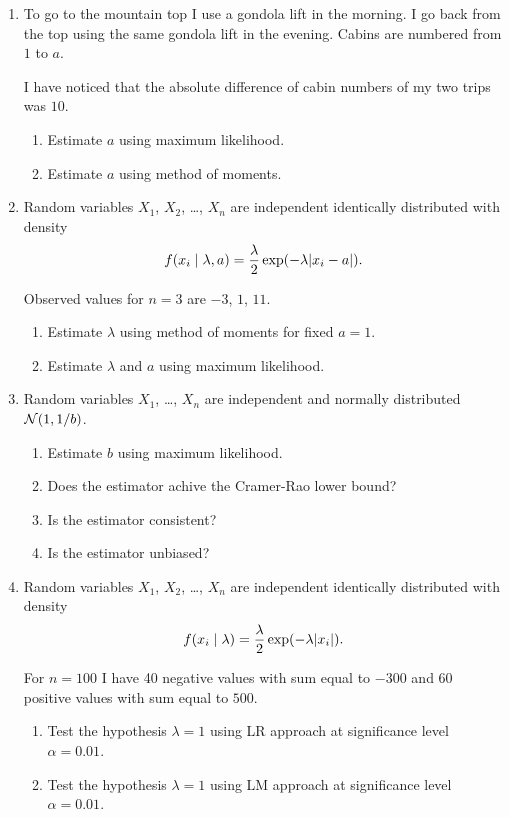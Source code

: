 \begin{enumerate}


    \item To go to the mountain top I use a gondola lift in the morning. 
    I go back from the top using the same gondola lift in the evening. 
    Cabins are numbered from $1$ to $a$. 

    I have noticed that the absolute difference of cabin numbers of my two trips was $10$. 

    \begin{enumerate}
        \item Estimate $a$ using maximum likelihood. 
        \item Estimate $a$ using method of moments. 
    \end{enumerate}

    \item Random variables $X_1$, $X_2$, \ldots,  $X_n$ are independent identically distributed with density 
    \[
    f(x_i \mid \lambda, a) = \frac{\lambda}{2} \exp(-\lambda \lvert x_i - a\rvert).    
    \]

    Observed values for $n=3$ are $-3$, $1$, $11$.

    \begin{enumerate}
        \item Estimate $\lambda$ using method of moments for fixed $a = 1$. 
        \item Estimate $\lambda$ and $a$ using maximum likelihood.
    \end{enumerate}

    \item Random variables $X_1$, \ldots, $X_n$ are independent and normally distributed $\mathcal{N}(1, 1/b)$. 
    
    \begin{enumerate}
        \item Estimate $b$ using maximum likelihood.
        \item Does the estimator achive the Cramer-Rao lower bound?
        \item Is the estimator consistent?
        \item Is the estimator unbiased?
    \end{enumerate}

    \item Random variables $X_1$, $X_2$, \ldots,  $X_n$ are independent identically distributed with density 
    \[
    f(x_i \mid \lambda) = \frac{\lambda}{2} \exp(-\lambda \lvert x_i\rvert).    
    \]

    For $n=100$ I have 40 negative values with sum equal to $-300$ and 60 positive values with sum equal to $500$. 

    \begin{enumerate}
        \item Test the hypothesis $\lambda = 1$ using LR approach at significance level $\alpha=0.01$.
        \item Test the hypothesis $\lambda = 1$ using LM approach at significance level $\alpha=0.01$.
    \end{enumerate}


\end{enumerate}


